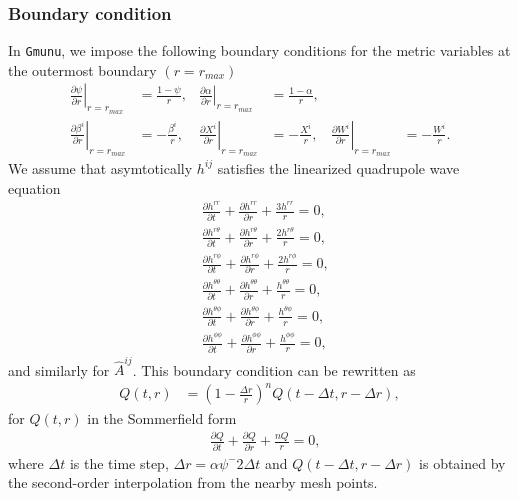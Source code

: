 \subsubsection{Boundary condition}
In \texttt{Gmunu}, we impose the following boundary conditions for the metric variables at the outermost boundary $(r=r_{max})$
\begin{align}
    \left.\frac{\partial \psi}{\partial r}\right|_{r=r_{max}} &= \frac{1-\psi}{r},
    &\left.\frac{\partial \alpha}{\partial r}\right|_{r=r_{max}} &= \frac{1-\alpha}{r}, \\
    \left.\frac{\partial \beta^i}{\partial r}\right|_{r=r_{max}} &= -\frac{\beta^i}{r},
    &\left.\frac{\partial X^i}{\partial r}\right|_{r=r_{max}} &= -\frac{X^i}{r}, 
    &\left.\frac{\partial W^i}{\partial r}\right|_{r=r_{max}} &= -\frac{W^i}{r}.
\end{align}
We assume that asymtotically $h^{ij}$ satisfies the linearized quadrupole wave equation \cite{teukolsky1982linearized}
\begin{align}
    &\frac{\partial h^{rr}}{\partial t} + \frac{\partial h^{rr}}{\partial r} + \frac{3 h^{rr}}{r} = 0, \\
    &\frac{\partial h^{r\theta}}{\partial t} + \frac{\partial h^{r\theta}}{\partial r} + \frac{2 h^{r\theta}}{r} = 0, \\
    &\frac{\partial h^{r\phi}}{\partial t} + \frac{\partial h^{r\phi}}{\partial r} + \frac{2 h^{r\phi}}{r} = 0, \\
    &\frac{\partial h^{\theta\theta}}{\partial t} + \frac{\partial h^{\theta\theta}}{\partial r} + \frac{h^{\theta\theta}}{r} = 0, \\
    &\frac{\partial h^{\theta\phi}}{\partial t} + \frac{\partial h^{\theta\phi}}{\partial r} + \frac{h^{\theta\phi}}{r} = 0, \\
    &\frac{\partial h^{\phi\phi}}{\partial t} + \frac{\partial h^{\phi\phi}}{\partial r} + \frac{h^{\phi\phi}}{r} = 0,
\end{align}
and similarly for $\hat{A}^{ij}$.
This boundary condition can be rewritten as \cite{shibata1995evolution}
\begin{align}
    Q(t,r) &= \left(1 - \frac{\Delta r}{r} \right)^n Q(t-\Delta t, r - \Delta r),
\end{align}
for $Q(t,r)$ in the Sommerfield form
\begin{align}
    &\frac{\partial Q}{\partial t} + \frac{\partial Q}{\partial r} + \frac{n Q}{r} = 0,
\end{align}
where $\Delta t$ is the time step, $\Delta r = \alpha \psi^-2 \Delta t$
and $Q(t-\Delta t, r - \Delta r)$ is obtained by the second-order interpolation from the nearby mesh points.
